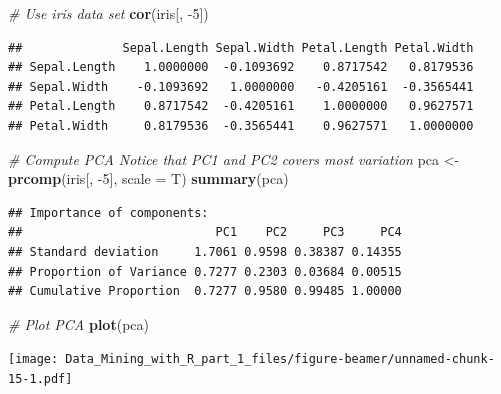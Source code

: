 \documentclass[ignorenonframetext,]{beamer}
\newenvironment{Shaded}{\begin{snugshade}}{\end{snugshade}}
\newcommand{\KeywordTok}[1]{\textcolor[rgb]{0.13,0.29,0.53}{\textbf{{#1}}}}
\newcommand{\DataTypeTok}[1]{\textcolor[rgb]{0.13,0.29,0.53}{{#1}}}
\newcommand{\DecValTok}[1]{\textcolor[rgb]{0.00,0.00,0.81}{{#1}}}
\newcommand{\StringTok}[1]{\textcolor[rgb]{0.31,0.60,0.02}{{#1}}}
\newcommand{\CommentTok}[1]{\textcolor[rgb]{0.56,0.35,0.01}{\textit{{#1}}}}
\newcommand{\NormalTok}[1]{{#1}}
\begin{document}
\begin{frame}[fragile]{}

\begin{Shaded}
\begin{Highlighting}[]
\CommentTok{# Use iris data set}
\KeywordTok{cor}\NormalTok{(iris[, -}\DecValTok{5}\NormalTok{])}
\end{Highlighting}
\end{Shaded}

\begin{verbatim}
##              Sepal.Length Sepal.Width Petal.Length Petal.Width
## Sepal.Length    1.0000000  -0.1093692    0.8717542   0.8179536
## Sepal.Width    -0.1093692   1.0000000   -0.4205161  -0.3565441
## Petal.Length    0.8717542  -0.4205161    1.0000000   0.9627571
## Petal.Width     0.8179536  -0.3565441    0.9627571   1.0000000
\end{verbatim}

\begin{Shaded}
\begin{Highlighting}[]
\CommentTok{# Compute PCA Notice that PC1 and PC2 covers most variation}
\NormalTok{pca <-}\StringTok{ }\KeywordTok{prcomp}\NormalTok{(iris[, -}\DecValTok{5}\NormalTok{], }\DataTypeTok{scale =} \NormalTok{T)}
\KeywordTok{summary}\NormalTok{(pca)}
\end{Highlighting}
\end{Shaded}

\begin{verbatim}
## Importance of components:
##                           PC1    PC2     PC3     PC4
## Standard deviation     1.7061 0.9598 0.38387 0.14355
## Proportion of Variance 0.7277 0.2303 0.03684 0.00515
## Cumulative Proportion  0.7277 0.9580 0.99485 1.00000
\end{verbatim}

\end{frame}

\begin{frame}[fragile]{}

\begin{Shaded}
\begin{Highlighting}[]
\CommentTok{# Plot PCA}
\KeywordTok{plot}\NormalTok{(pca)}
\end{Highlighting}
\end{Shaded}

\texttt{[image: Data\_Mining\_with\_R\_part\_1\_files/figure-beamer/unnamed-chunk-15-1.pdf]}

\end{frame}
\end{document}
